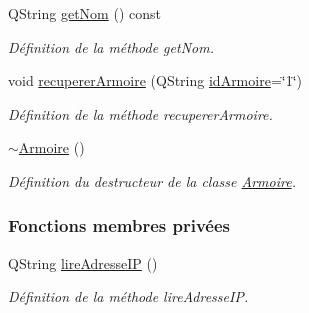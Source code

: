 \begin{DoxyCompactItemize}
Q\+String \hyperlink{class_armoire_a0045e45e0c9a465af765667344ce8bee}{get\+Nom} () const
\begin{DoxyCompactList}\small\item\em Définition de la méthode get\+Nom. \end{DoxyCompactList}\item 
void \hyperlink{class_armoire_a1c5266f9e4b01c0d2e1d244d2f11fffd}{recuperer\+Armoire} (Q\+String \hyperlink{class_armoire_a131caceb7d4b90cb7761851757e80f57}{id\+Armoire}=\char`\"{}1\char`\"{})
\begin{DoxyCompactList}\small\item\em Définition de la méthode recuperer\+Armoire. \end{DoxyCompactList}\item 
\hyperlink{class_armoire_a0f506a879391a987f12f59a23f60634e}{$\sim$\+Armoire} ()
\begin{DoxyCompactList}\small\item\em Définition du destructeur de la classe \hyperlink{class_armoire}{Armoire}. \end{DoxyCompactList}\end{DoxyCompactItemize}
\subsubsection*{Fonctions membres privées}
\begin{DoxyCompactItemize}
\item 
Q\+String \hyperlink{class_armoire_abc30649cc7d4f3c0cefcc54894aeb406}{lire\+Adresse\+IP} ()
\begin{DoxyCompactList}\small\item\em Définition de la méthode lire\+Adresse\+IP. \end{DoxyCompactList}\end{DoxyCompactItemize}
